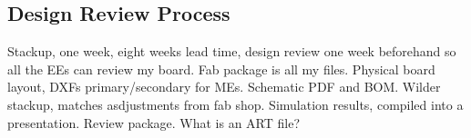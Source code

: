 \documentclass{article}
\begin{document}
\subsection{Design Review Process}
Stackup, one week, eight weeks lead time, design review one week beforehand so all the EEs can review my board. Fab package is all my files. Physical board layout, DXFs primary/secondary for MEs. Schematic PDF and BOM. Wilder stackup, matches asdjustments from fab shop. Simulation results, compiled into a presentation. Review package. What is an ART file?
\end{document}
